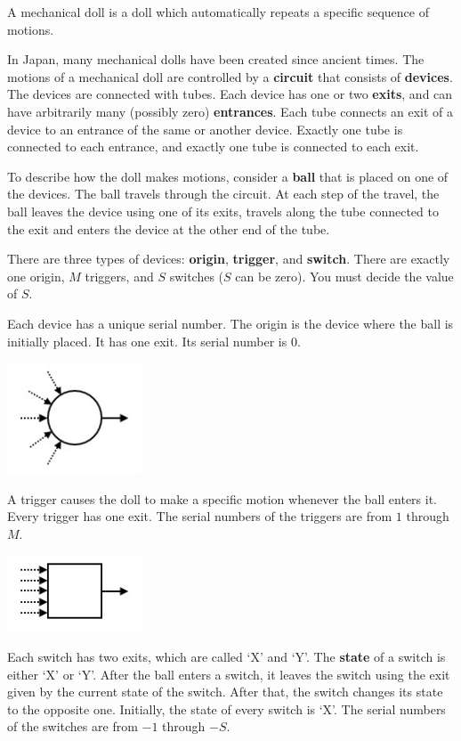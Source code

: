 A mechanical doll is a doll which automatically repeats a specific sequence of motions.

In Japan, many mechanical dolls have been created since ancient times.
The motions of a mechanical doll are controlled by a \textbf{circuit} that consists of \textbf{devices}.
The devices are connected with tubes. Each device has one or two \textbf{exits}, and can have
arbitrarily many (possibly zero) \textbf{entrances}. Each tube connects an exit of a device to
an entrance of the same or another device. Exactly one tube is connected to each
entrance, and exactly one tube is connected to each exit.

To describe how the doll makes motions, consider a \textbf{ball} that is placed on one of the
devices. The ball travels through the circuit. At each step of the travel, the ball leaves
the device using one of its exits, travels along the tube connected to the exit and enters
the device at the other end of the tube.

There are three types of devices: \textbf{origin}, \textbf{trigger}, and \textbf{switch}. There are exactly one
origin, $M$ triggers, and $S$ switches ($S$ can be zero). You must decide the value of $S$.

Each device has a unique serial number.
The origin is the device where the ball is initially placed. It has one exit. Its serial
number is $0$.

\includegraphics{1.png}


A trigger causes the doll to make a specific motion whenever the ball enters it. Every
trigger has one exit. The serial numbers of the triggers are from $1$ through $M$.

\includegraphics{2.png}

Each switch has two exits, which are called `X' and `Y'. The \textbf{state} of a switch is either
`X' or `Y'. After the ball enters a switch, it leaves the switch using the exit given by the
current state of the switch. After that, the switch changes its state to the opposite one.
Initially, the state of every switch is `X'. The serial numbers of the switches are from $-1$ through $-S$.


